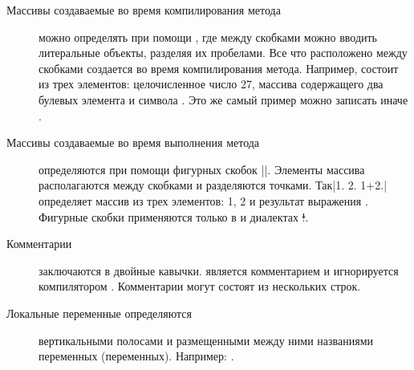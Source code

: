 \documentclass[a4paper,10pt,twoside]{book}
\begin{document}
\begin{description}
\item[Массивы создаваемые во время компилирования метода] можно определять при помощи \ct{#()}, где между скобками можно вводить литеральные объекты, разделяя их пробелами.
		Все что расположено между скобками создается во время компилирования метода.
		Например,  состоит из трех элементов: целочисленное число 27, массива содержащего два булевых элемента и символа .
		Это же самый пример можно записать иначе .

\item[Массивы создаваемые во время выполнения метода] определяются при помощи фигурных скобок \ct|{}|.
		 Элементы массива располагаются между скобками и разделяются точками.
		Так\ct|{1. 2. 1+2.}| определяет массив из трех элементов: 1, 2 и результат выражения .
		Фигурные скобки применяются только в \pharo и \squeak диалектах \st!.

\item[Комментарии] заключаются в двойные кавычки.
		является комментарием и игнорируется компилятором \pharo.
		Комментарии могут состоят из нескольких строк.
		
\item[Локальные переменные определяются]	вертикальными полосами \ct{| |} и размещенными между ними названиями переменных (переменных).
		Например: .	


\end{description}
\end{document}
